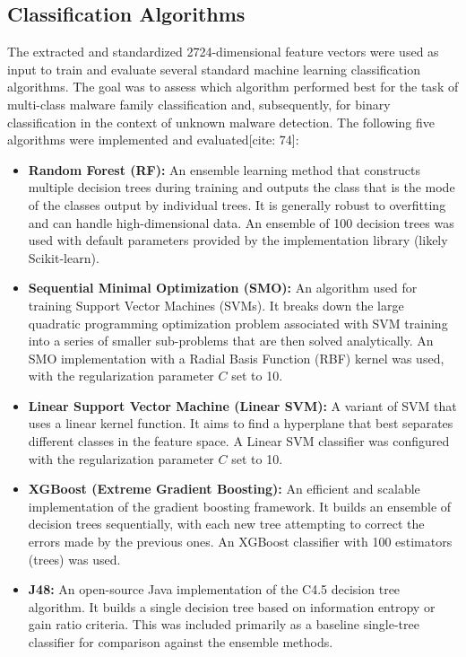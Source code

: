 \subsection{Classification Algorithms}
\label{subsec:classification_algos}

The extracted and standardized 2724-dimensional feature vectors were used as input to train and evaluate several standard machine learning classification algorithms. The goal was to assess which algorithm performed best for the task of multi-class malware family classification and, subsequently, for binary classification in the context of unknown malware detection. The following five algorithms were implemented and evaluated[cite: 74]:

\begin{itemize}
    \item \textbf{Random Forest (RF):} An ensemble learning method that constructs multiple decision trees during training and outputs the class that is the mode of the classes output by individual trees. It is generally robust to overfitting and can handle high-dimensional data. An ensemble of 100 decision trees was used with default parameters provided by the implementation library (likely Scikit-learn).
    \item \textbf{Sequential Minimal Optimization (SMO):} An algorithm used for training Support Vector Machines (SVMs). It breaks down the large quadratic programming optimization problem associated with SVM training into a series of smaller sub-problems that are then solved analytically. An SMO implementation with a Radial Basis Function (RBF) kernel was used, with the regularization parameter $C$ set to 10.
    \item \textbf{Linear Support Vector Machine (Linear SVM):} A variant of SVM that uses a linear kernel function. It aims to find a hyperplane that best separates different classes in the feature space. A Linear SVM classifier was configured with the regularization parameter $C$ set to 10.
    \item \textbf{XGBoost (Extreme Gradient Boosting):} An efficient and scalable implementation of the gradient boosting framework. It builds an ensemble of decision trees sequentially, with each new tree attempting to correct the errors made by the previous ones. An XGBoost classifier with 100 estimators (trees) was used.
    \item \textbf{J48:} An open-source Java implementation of the C4.5 decision tree algorithm. It builds a single decision tree based on information entropy or gain ratio criteria. This was included primarily as a baseline single-tree classifier for comparison against the ensemble methods.
\end{itemize}

